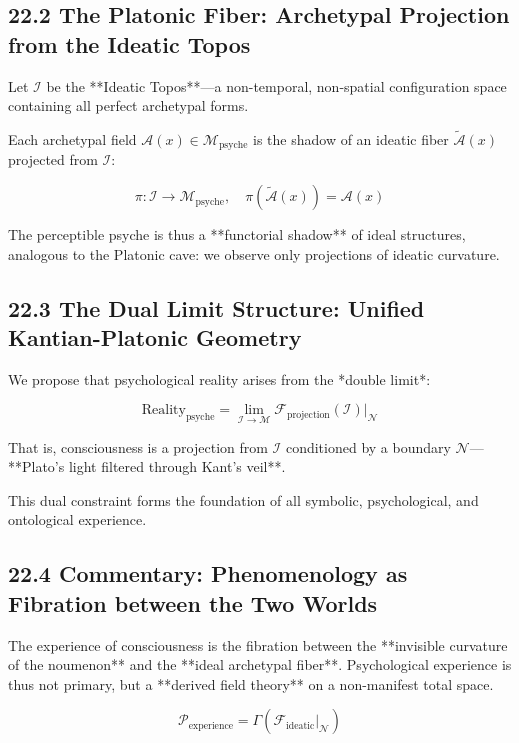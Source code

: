 \documentclass[12pt]{article}
\begin{document}
\begin{enumerate}
\subsection*{22.2 The Platonic Fiber: Archetypal Projection from the Ideatic Topos}

Let $\mathcal{I}$ be the **Ideatic Topos**—a non-temporal, non-spatial configuration space containing all perfect archetypal forms.

Each archetypal field $\mathcal{A}(x) \in \mathcal{M}_\text{psyche}$ is the shadow of an ideatic fiber $\tilde{\mathcal{A}}(x)$ projected from $\mathcal{I}$:

\[
\pi: \mathcal{I} \to \mathcal{M}_\text{psyche}, \quad \pi(\tilde{\mathcal{A}}(x)) = \mathcal{A}(x)
\]

The perceptible psyche is thus a **functorial shadow** of ideal structures,  
analogous to the Platonic cave: we observe only projections of ideatic curvature.

\subsection*{22.3 The Dual Limit Structure: Unified Kantian-Platonic Geometry}

We propose that psychological reality arises from the *double limit*:

\[
\text{Reality}_{\text{psyche}} = \lim_{\mathcal{I} \to \mathcal{M}} \mathcal{F}_{\text{projection}}(\mathcal{I}) \big|_{\mathcal{N}}
\]

That is, consciousness is a projection from $\mathcal{I}$ conditioned by a boundary $\mathcal{N}$—  
**Plato’s light filtered through Kant’s veil**.

This dual constraint forms the foundation of all symbolic, psychological, and ontological experience.

\subsection*{22.4 Commentary: Phenomenology as Fibration between the Two Worlds}

The experience of consciousness is the fibration between the **invisible curvature of the noumenon** and the **ideal archetypal fiber**.  
Psychological experience is thus not primary, but a **derived field theory** on a non-manifest total space.

\[
\mathcal{P}_\text{experience} = \Gamma\left( \mathcal{F}_{\text{ideatic}} \big|_{\mathcal{N}} \right)
\]


\end{enumerate}
\end{document}
